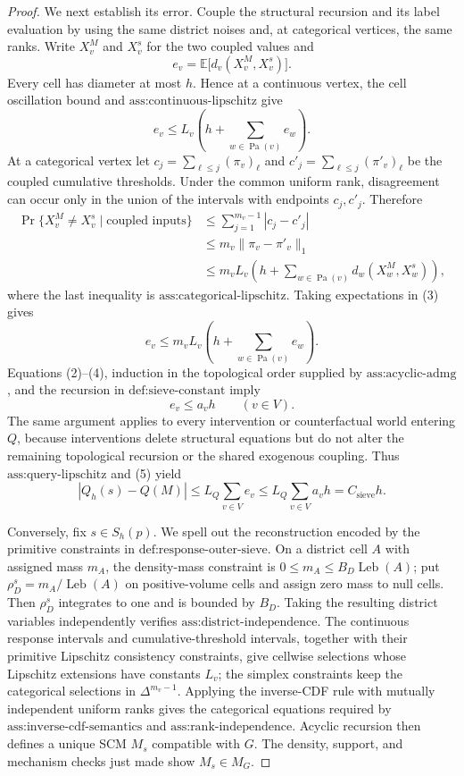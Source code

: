 \documentclass{article}
\begin{document}
\begin{proof}
We next establish its error.  Couple the structural recursion and its label evaluation by using the same district noises and, at categorical vertices, the same ranks.  Write \(X_v^M\) and \(X_v^s\) for the two coupled values and
\[
e_v=\mathbb E\bigl[d_v(X_v^M,X_v^s)\bigr].
\]
Every cell has diameter at most \(h\).  Hence at a continuous vertex, the cell oscillation bound and \(\text{ass:continuous-lipschitz}\) give
\[
e_v\leq L_v\left(h+\sum_{w\in\operatorname{Pa}(v)}e_w\right).    \tag{2}
\]
At a categorical vertex let \(c_j=\sum_{\ell\leq j}(\pi_v)_\ell\) and \(c'_j=\sum_{\ell\leq j}(\pi'_v)_\ell\) be the coupled cumulative thresholds.  Under the common uniform rank, disagreement can occur only in the union of the intervals with endpoints \(c_j,c'_j\).  Therefore
\[
\begin{aligned}
\Pr\{X_v^M\ne X_v^s\mid\text{coupled inputs}\}
&\leq \sum_{j=1}^{m_v-1}|c_j-c'_j|\\
&\leq m_v\lVert\pi_v-\pi'_v\rVert_1\\
&\leq m_vL_v\left(h+\sum_{w\in\operatorname{Pa}(v)}d_w(X_w^M,X_w^s)\right),
\end{aligned}                                                       \tag{3}
\]
where the last inequality is \(\text{ass:categorical-lipschitz}\).  Taking expectations in (3) gives
\[
e_v\leq m_vL_v\left(h+\sum_{w\in\operatorname{Pa}(v)}e_w\right). \tag{4}
\]
Equations (2)--(4), induction in the topological order supplied by \(\text{ass:acyclic-admg}\), and the recursion in \(\text{def:sieve-constant}\) imply
\[
e_v\leq a_vh\qquad(v\in V).                                      \tag{5}
\]
The same argument applies to every intervention or counterfactual world entering \(Q\), because interventions delete structural equations but do not alter the remaining topological recursion or the shared exogenous coupling.  Thus \(\text{ass:query-lipschitz}\) and (5) yield
\[
|Q_h(s)-Q(M)|
 \leq L_Q\sum_{v\in V}e_v
 \leq L_Q\sum_{v\in V}a_vh
 =C_{\mathrm{sieve}}h.                                           \tag{6}
\]

Conversely, fix \(s\in S_h(p)\).  We spell out the reconstruction encoded by the primitive constraints in \(\text{def:response-outer-sieve}\).  On a district cell \(A\) with assigned mass \(m_A\), the density-mass constraint is \(0\leq m_A\leq B_D\operatorname{Leb}(A)\); put \(\rho_D^s=m_A/\operatorname{Leb}(A)\) on positive-volume cells and assign zero mass to null cells.  Then \(\rho_D^s\) integrates to one and is bounded by \(B_D\).  Taking the resulting district variables independently verifies \(\text{ass:district-independence}\).  The continuous response intervals and cumulative-threshold intervals, together with their primitive Lipschitz consistency constraints, give cellwise selections whose Lipschitz extensions have constants \(L_v\); the simplex constraints keep the categorical selections in \(\Delta^{m_v-1}\).  Applying the inverse-CDF rule with mutually independent uniform ranks gives the categorical equations required by \(\text{ass:inverse-cdf-semantics}\) and \(\text{ass:rank-independence}\).  Acyclic recursion then defines a unique SCM \(M_s\) compatible with \(G\).  The density, support, and mechanism checks just made show \(M_s\in M_G\).


\end{proof}
\end{document}
